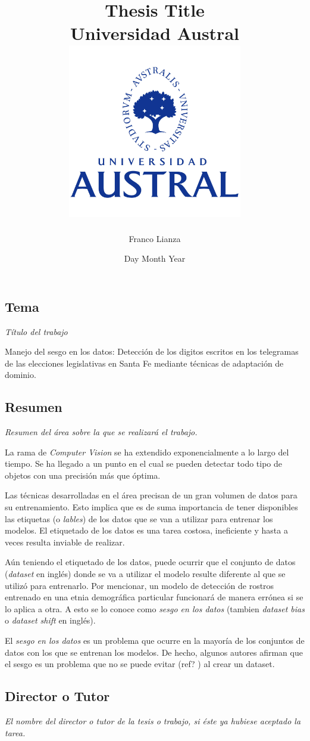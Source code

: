 \documentclass[twoside]{report}
\title{
	{Thesis Title}\\
	{\large Universidad Austral}\\
	{\includegraphics[width=3in,height=3in]{university.jpg}}
}
\author{Franco Lianza}
\date{Day Month Year}
\begin{document}
\maketitle

\subsection*{Tema}
{\it Título del trabajo}

Manejo del sesgo en los datos: Detecci\'on de los digitos escritos en los
telegramas de las elecciones legislativas en Santa Fe mediante t\'ecnicas de
adaptaci\'on de dominio.

\subsection*{Resumen}
{\it Resumen del área sobre la que se realizará el trabajo.}

La rama de {\it Computer Vision} se ha extendido exponencialmente a lo largo
del tiempo. Se ha llegado a un punto en el cual se pueden detectar todo tipo de
objetos con una precisi\'on m\'as que \'optima.

Las t\'ecnicas desarrolladas en el \'area precisan de un gran volumen de datos
para su entrenamiento. Esto implica que es de suma importancia de tener
disponibles las etiquetas (o {\it lables}) de los datos que se van a utilizar
para entrenar los modelos. El etiquetado de los datos es una tarea costosa,
ineficiente y hasta a veces resulta inviable de realizar.

A\'un teniendo el etiquetado de los datos, puede ocurrir que el conjunto de
datos ({\it dataset} en ingl\'es) donde se va a utilizar el modelo resulte
diferente al que se utilizó para entrenarlo. Por mencionar, un modelo de
detecci\'on de rostros entrenado en una etnia demogr\'afica particular
funcionar\'a de manera err\'onea si se lo aplica a otra. A esto se lo conoce
como {\it sesgo en los datos} (tambien {\it dataset bias} o {\it dataset shift}
en ingl\'es).

El {\it sesgo en los datos} es un problema que ocurre en la mayor\'ia de los
conjuntos de datos con los que se entrenan los modelos. De hecho, algunos
autores afirman que el sesgo es un problema que no se puede evitar (ref? ) al
crear un dataset.

\subsection*{Director o Tutor}
{\it El nombre del director o tutor de la tesis o trabajo, si éste ya
	hubiese aceptado la tarea.}
\end{document}
